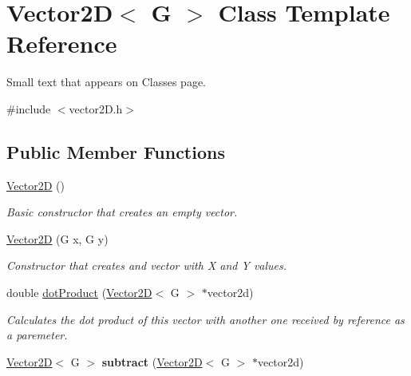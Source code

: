 \hypertarget{class_vector2_d}{}\section{Vector2\+D$<$ G $>$ Class Template Reference}
\label{class_vector2_d}


Small text that appears on Classes page.  




{\ttfamily \#include $<$vector2\+D.\+h$>$}

\subsection*{Public Member Functions}
\begin{DoxyCompactItemize}
\item 
\hypertarget{class_vector2_d_a3bce991141a2cfd9c381651c06d2bee5}{}\hyperlink{class_vector2_d_a3bce991141a2cfd9c381651c06d2bee5}{Vector2\+D} ()\label{class_vector2_d_a3bce991141a2cfd9c381651c06d2bee5}

\begin{DoxyCompactList}\small\item\em Basic constructor that creates an empty vector. \end{DoxyCompactList}\item 
\hypertarget{class_vector2_d_a25ac574bd1a4deb41a9b198afd5f2787}{}\hyperlink{class_vector2_d_a25ac574bd1a4deb41a9b198afd5f2787}{Vector2\+D} (G x, G y)\label{class_vector2_d_a25ac574bd1a4deb41a9b198afd5f2787}

\begin{DoxyCompactList}\small\item\em Constructor that creates and vector with X and Y values. \end{DoxyCompactList}\item 
\hypertarget{class_vector2_d_abbf351182e5d3e725a0b75e82435b846}{}double \hyperlink{class_vector2_d_abbf351182e5d3e725a0b75e82435b846}{dot\+Product} (\hyperlink{class_vector2_d}{Vector2\+D}$<$ G $>$ $\ast$vector2d)\label{class_vector2_d_abbf351182e5d3e725a0b75e82435b846}

\begin{DoxyCompactList}\small\item\em Calculates the dot product of this vector with another one received by reference as a paremeter. \end{DoxyCompactList}\item 
\hypertarget{class_vector2_d_acbe06ed3f1f2360d4826f3914a299aeb}{}\hyperlink{class_vector2_d}{Vector2\+D}$<$ G $>$ {\bfseries subtract} (\hyperlink{class_vector2_d}{Vector2\+D}$<$ G $>$ $\ast$vector2d)\label{class_vector2_d_acbe06ed3f1f2360d4826f3914a299aeb}


\end{DoxyCompactItemize}
